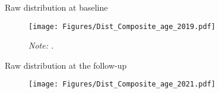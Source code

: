 \documentclass[aspectratio=169,numbering=none]{beamer}
\begin{document}
\begin{frame}[plain]{Raw distribution at baseline}
\begin{figure}[H]
\begin{center}
\texttt{[image: Figures/Dist\_Composite\_age\_2019.pdf]} 
\end{center}
\footnotesize{\emph{Note: .}}
\end{figure}
\end{frame}

\begin{frame}[plain]{Raw distribution at the follow-up}
\begin{figure}[H]
\begin{center}
\texttt{[image: Figures/Dist\_Composite\_age\_2021.pdf]} 
\end{center}
\end{figure}
\end{frame}
\end{document}
